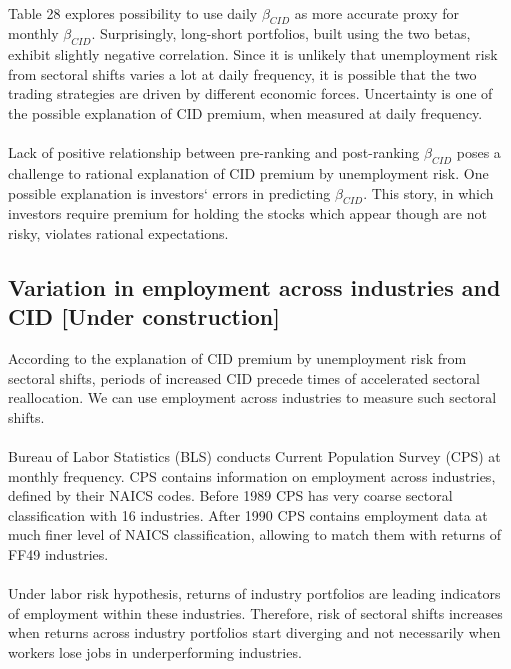 \documentclass[12pt]{article}
\begin{document}
\paragraph{}
Table 28 explores possibility to use daily $\beta_{CID}$ as more accurate proxy for monthly $\beta_{CID}$. Surprisingly, long-short portfolios, built using the two betas, exhibit slightly negative correlation. Since it is unlikely that unemployment risk from sectoral shifts varies a lot at daily frequency, it is possible that the two trading strategies are driven by different economic forces. Uncertainty is one of the possible explanation of CID premium, when measured at daily frequency.
\paragraph{}
Lack of positive relationship between pre-ranking and post-ranking $\beta_{CID}$ poses a challenge to rational explanation of CID premium by unemployment risk. One possible explanation is investors` errors in predicting $\beta_{CID}$. This story, in which investors require premium for holding the stocks which appear though are not risky, violates rational expectations. 

\subsection{Variation in employment across industries and CID [Under construction]}

According to the explanation of CID premium by unemployment risk from sectoral shifts, periods of increased CID precede times of accelerated sectoral reallocation. We can use employment across industries to measure such sectoral shifts.
\paragraph{}
Bureau of Labor Statistics (BLS) conducts Current Population Survey (CPS) at monthly frequency. CPS contains information on employment across industries, defined by their NAICS codes. Before 1989 CPS has very coarse sectoral classification with 16 industries. After 1990 CPS contains employment data at much finer level of NAICS classification, allowing to match them with returns of FF49 industries. \paragraph{}
Under labor risk hypothesis, returns of industry portfolios are leading indicators of employment within these industries. Therefore, risk of sectoral shifts increases when returns across industry portfolios start diverging and not necessarily when workers lose jobs in underperforming industries.
\end{document}
